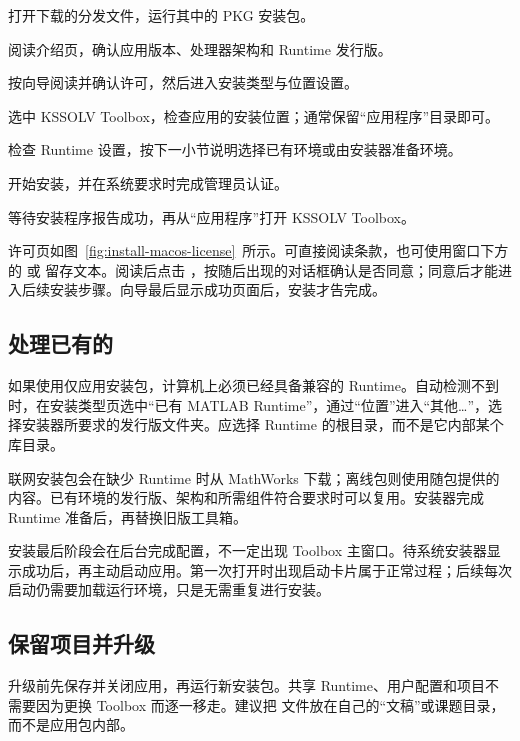 \begin{steps}
\item 打开下载的分发文件，运行其中的 PKG 安装包。
\item 阅读介绍页，确认应用版本、处理器架构和 Runtime 发行版。
\item 按向导阅读并确认许可，然后进入安装类型与位置设置。
\item 选中 KSSOLV Toolbox，检查应用的安装位置；通常保留“应用程序”目录即可。
\item 检查 Runtime 设置，按下一小节说明选择已有环境或由安装器准备环境。
\item 开始安装，并在系统要求时完成管理员认证。
\item 等待安装程序报告成功，再从“应用程序”打开 KSSOLV Toolbox。
\end{steps}

许可页如图~\ref{fig:install-macos-license}~所示。可直接阅读条款，也可使用窗口下方的  或  留存文本。阅读后点击 ，按随后出现的对话框确认是否同意；同意后才能进入后续安装步骤。向导最后显示成功页面后，安装才告完成。



\subsection{处理已有的 }

如果使用仅应用安装包，计算机上必须已经具备兼容的 Runtime。自动检测不到时，在安装类型页选中“已有 MATLAB\regmark{} Runtime”，通过“位置”进入“其他…”，选择安装器所要求的发行版文件夹。应选择 Runtime 的根目录，而不是它内部某个库目录。

联网安装包会在缺少 Runtime 时从 MathWorks 下载；离线包则使用随包提供的内容。已有环境的发行版、架构和所需组件符合要求时可以复用。安装器完成 Runtime 准备后，再替换旧版工具箱。

安装最后阶段会在后台完成配置，不一定出现 Toolbox 主窗口。待系统安装器显示成功后，再主动启动应用。第一次打开时出现启动卡片属于正常过程；后续每次启动仍需要加载运行环境，只是无需重复进行安装。

\subsection{保留项目并升级}

升级前先保存并关闭应用，再运行新安装包。共享 Runtime、用户配置和项目不需要因为更换 Toolbox 而逐一移走。建议把  文件放在自己的“文稿”或课题目录，而不是应用包内部。

